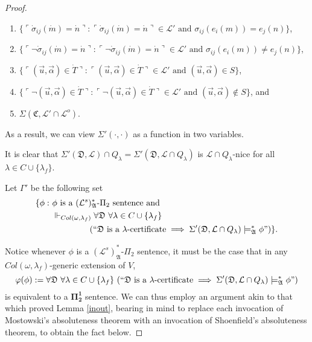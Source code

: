 \documentclass[12pt]{article}
\numberwithin{equation}{section}
\begin{document}
\begin{proof}
\begin{defi}
\begin{enumerate}[label=(\alph*)]
    \item $\{\ulcorner \dot{\sigma}_{ij}(\dot{m}) = \dot{n} \urcorner : \ulcorner \dot{\sigma}_{ij}(\dot{m}) = \dot{n} \urcorner \in \mathcal{L}' \text{ and } \sigma_{ij}(e_i(m)) = e_j(n)\}$,
    \item $\{\ulcorner \neg \dot{\sigma}_{ij}(\dot{m}) = \dot{n} \urcorner : \ulcorner \neg \dot{\sigma}_{ij}(\dot{m}) = \dot{n} \urcorner \in \mathcal{L}' \text{ and } \sigma_{ij}(e_i(m)) \neq e_j(n)\}$,
    \item $\{\ulcorner (\Vec{u}, \Vec{\alpha}) \in \dot{T} \urcorner : \ulcorner (\Vec{u}, \Vec{\alpha}) \in \dot{T} \urcorner \in \mathcal{L}' \text{ and } (\Vec{u}, \Vec{\alpha}) \in S\}$,
    \item $\{\ulcorner \neg (\Vec{u}, \Vec{\alpha}) \in \dot{T} \urcorner : \ulcorner \neg (\Vec{u}, \Vec{\alpha}) \in \dot{T} \urcorner \in \mathcal{L}' \text{ and } (\Vec{u}, \Vec{\alpha}) \not\in S\}$, and
    \item $\Sigma(\mathfrak{C}, \mathcal{L}' \cap \mathcal{L}^o)$.
\end{enumerate}
As a result, we can view $\Sigma'(\cdot, \cdot)$ as a function in two variables.
\end{defi}

It is clear that $\Sigma'(\mathfrak{D}, \mathcal{L}) \cap Q_{\lambda} = \Sigma'(\mathfrak{D}, \mathcal{L} \cap Q_{\lambda})$ is $\mathcal{L} \cap Q_{\lambda}$-nice for all $\lambda \in C \cup \{\lambda_f\}$.

\begin{defi}
Let $\Gamma'$ be the following set
\begin{align*}
    \{\phi : \ & \phi \text{ is a } (\mathcal{L}^s)^*_{\mathfrak{A}}\text{-}\Pi_2 \text{ sentence and} \\
    & \Vdash_{Col(\omega, \lambda_f)} \forall \mathfrak{D} \ \forall \lambda \in C \cup \{\lambda_f\} \\
    & \mspace{80mu} (``\mathfrak{D} \text{ is a } \lambda \text{-certificate} \implies \Sigma'(\mathfrak{D}, \mathcal{L} \cap Q_{\lambda}) \models^*_{\mathfrak{A}} \phi")\} \text{.}
\end{align*}
\end{defi}

Notice whenever $\phi$ is a $(\mathcal{L}^s)^*_{\mathfrak{A}}$-$\Pi_2$ sentence, it must be the case that in any $Col(\omega, \lambda_f)$-generic extension of $V$, 
\begin{equation*}
    \varphi(\phi) := \forall \mathfrak{D} \ \forall \lambda \in C \cup \{\lambda_f\} \ (``\mathfrak{D} \text{ is a } \lambda \text{-certificate} \implies \Sigma'(\mathfrak{D}, \mathcal{L} \cap Q_{\lambda}) \models^*_{\mathfrak{A}} \phi")
\end{equation*}
is equivalent to a $\mathbf{\Pi^1_2}$ sentence. We can thus employ an argument akin to that which proved Lemma \ref{inout}, bearing in mind to replace each invocation of Mostowski's absoluteness theorem with an invocation of Shoenfield's absoluteness theorem, to obtain the fact below.


\end{proof}
\end{document}
